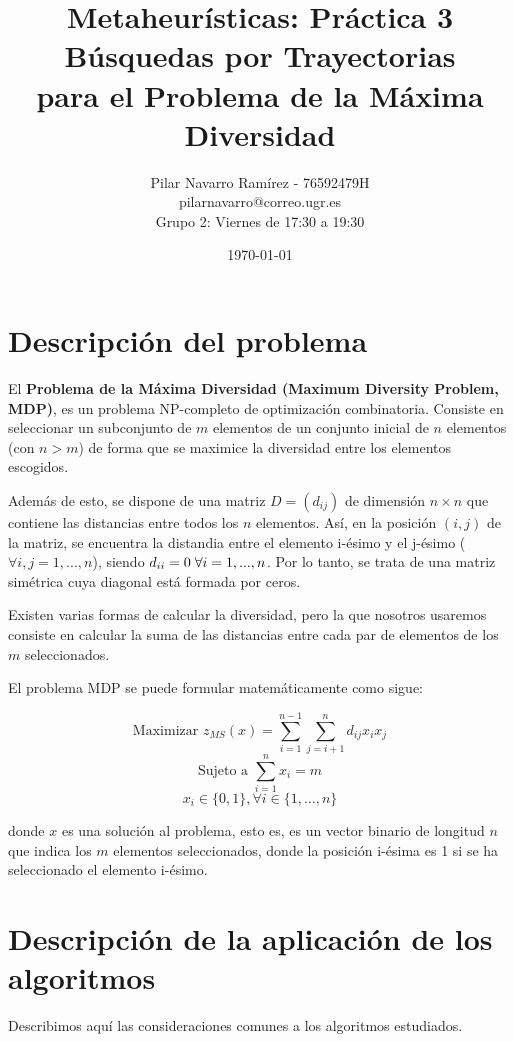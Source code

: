 \documentclass[11pt,a4paper]{article}
\title{\textbf{\huge Metaheurísticas: Práctica 3}
	\\\medskip \Large Búsquedas por Trayectorias\\ para el Problema de la Máxima Diversidad \medskip}
\author{Pilar Navarro Ramírez - 76592479H \\ pilarnavarro@correo.ugr.es \\ Grupo 2: Viernes de 17:30 a 19:30}
\date{ \today }
\begin{document}
	
	
	\maketitle 
	\newpage
	\tableofcontents
	\newpage
	
	
	\section{Descripción del problema}
	
	
	El \textbf{Problema de la Máxima Diversidad (Maximum Diversity Problem, MDP)}, es un problema NP-completo de optimización combinatoria. 
	Consiste en seleccionar un subconjunto de $m$ elementos de un conjunto inicial de $n$ elementos (con $n>m$) de forma que se maximice la diversidad entre los elementos escogidos.
	
	Además de esto, se dispone de una matriz $D=(d_{ij})$ de dimensión $n\times n$ que contiene las distancias entre todos los $ n $ elementos. Así, en la posición $(i,j)$ de la matriz, se encuentra la distandia entre el elemento i-ésimo y el j-ésimo ($\forall i,j=1,...,n$), siendo $d_{ii}=0\hspace{1mm}\forall i=1,...,n$. Por lo tanto, se trata de una matriz simétrica cuya diagonal está formada por ceros. 
	
	Existen varias formas de calcular la diversidad, pero la que nosotros usaremos consiste en calcular la suma de las distancias entre cada par de elementos de los $m$ seleccionados. 
	
	 El problema MDP se puede formular matemáticamente como sigue:
	
	$$ \text{Maximizar } z_{MS}(x) = \sum_{i=1}^{n-1} \sum_{j=i+1}^{n} d_{ij} x_i x_j $$
	$$ \text{Sujeto a } \sum_{i=1}^{n} x_i = m $$
	$$ x_i \in \{0,1\}, \forall i \in \{1,\dotsc,n\} $$
	
	donde $x$ es una solución al problema, esto es, es un vector binario de longitud $n$ que indica los $m$ elementos seleccionados, donde la posición i-ésima es 1 si se ha seleccionado el elemento i-ésimo.
	
	\newpage

	
	\section{Descripción de la aplicación de los algoritmos}
	
	Describimos aquí las consideraciones comunes a los algoritmos estudiados.
	
\end{document}
